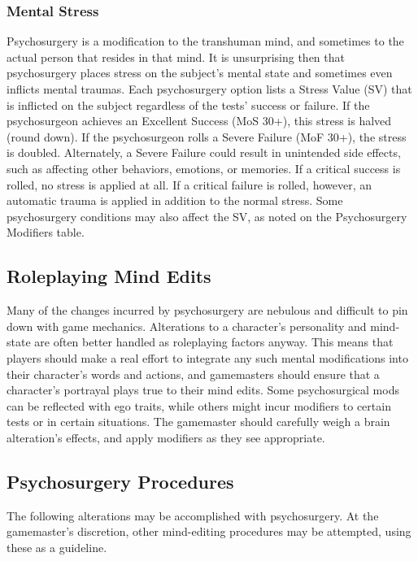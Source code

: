\subsubsection{Mental Stress}
Psychosurgery is a modification to the transhuman
mind, and sometimes to the actual person that resides
in that mind. It is unsurprising then that psychosurgery
places stress on the subject’s mental state and
sometimes even inflicts mental traumas.
Each psychosurgery option lists a Stress Value
(SV) that is inflicted on the subject regardless of
the tests’ success or failure. If the psychosurgeon
achieves an Excellent Success (MoS 30+), this stress
is halved (round down). If the psychosurgeon rolls
a Severe Failure (MoF 30+), the stress is doubled.
Alternately, a Severe Failure could result in unintended
side effects, such as affecting other behaviors,
emotions, or memories.
If a critical success is rolled, no stress is applied at
all. If a critical failure is rolled, however, an automatic
trauma is applied in addition to the normal stress.
Some psychosurgery conditions may also affect the
SV, as noted on the Psychosurgery Modifiers table.


\subsection{Roleplaying Mind Edits}
Many of the changes incurred by psychosurgery are
nebulous and difficult to pin down with game mechanics.
Alterations to a character’s personality and
mind-state are often better handled as roleplaying factors
anyway. This means that players should make a
real effort to integrate any such mental modifications
into their character’s words and actions, and gamemasters
should ensure that a character’s portrayal
plays true to their mind edits. Some psychosurgical
mods can be reflected with ego traits, while others
might incur modifiers to certain tests or in certain
situations. The gamemaster should carefully weigh a
brain alteration’s effects, and apply modifiers as they
see appropriate.


\subsection{Psychosurgery Procedures}
The following alterations may be accomplished with
psychosurgery. At the gamemaster’s discretion, other
mind-editing procedures may be attempted, using
these as a guideline.

